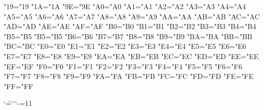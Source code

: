 \lccode"19="19 %
\lccode"1A="1A %
\lccode"9E="9E %
\lccode"A0="A0 %
\lccode"A1="A1 %
\lccode"A2="A2 %
\lccode"A3="A3 %
\lccode"A4="A4 %
\lccode"A5="A5 %
\lccode"A6="A6 %
\lccode"A7="A7 %
\lccode"A8="A8 %
\lccode"A9="A9 %
\lccode"AA="AA %
\lccode"AB="AB %
\lccode"AC="AC %
\lccode"AD="AD %
\lccode"AE="AE %
\lccode"AF="AF %
\lccode"B0="B0 %
\lccode"B1="B1 %
\lccode"B2="B2 %
\lccode"B3="B3 %
\lccode"B4="B4 %
\lccode"B5="B5 %
\lccode"B5="B5 %
\lccode"B6="B6 %
\lccode"B7="B7 %
\lccode"B8="B8 %
\lccode"B9="B9 %
\lccode"BA="BA %
\lccode"BB="BB %
\lccode"BC="BC %
\lccode"E0="E0 %
\lccode"E1="E1 %
\lccode"E2="E2 %
\lccode"E3="E3 %
\lccode"E4="E4 %
\lccode"E5="E5 %
\lccode"E6="E6 %
\lccode"E7="E7 %
\lccode"E8="E8 %
\lccode"E9="E9 %
\lccode"EA="EA %
\lccode"EB="EB %
\lccode"EC="EC %
\lccode"ED="ED %
\lccode"EE="EE %
\lccode"EF="EF %
\lccode"F0="F0 %
\lccode"F1="F1 %
\lccode"F2="F2 %
\lccode"F3="F3 %
\lccode"F4="F4 %
\lccode"F5="F5 %
\lccode"F6="F6 %
\lccode"F7="F7 %
\lccode"F8="F8 %
\lccode"F9="F9 %
\lccode"FA="FA %
\lccode"FB="FB %
\lccode"FC="FC %
\lccode"FD="FD %
\lccode"FE="FE %
\lccode"FF="FF %

\lccode`\'=`\'
\catcode`-=11


